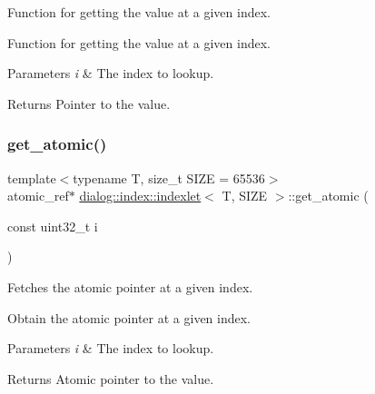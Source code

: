 Function for getting the value at a given index. 

Function for getting the value at a given index.


\begin{DoxyParams}{Parameters}
{\em i} & The index to lookup. \\
\hline
\end{DoxyParams}
\begin{DoxyReturn}{Returns}
Pointer to the value. 
\end{DoxyReturn}
\mbox{\label{classdialog_1_1index_1_1indexlet_ab3d280e9176781621a9b9c627c7db0e6}} 
\subsubsection{\texorpdfstring{get\+\_\+atomic()}{get\_atomic()}}
{\footnotesize\ttfamily template$<$typename T, size\+\_\+t S\+I\+ZE = 65536$>$ \\
atomic\+\_\+ref$\ast$ \hyperlink{classdialog_1_1index_1_1indexlet}{dialog\+::index\+::indexlet}$<$ T, S\+I\+ZE $>$\+::get\+\_\+atomic (\begin{DoxyParamCaption}\item[{const uint32\+\_\+t}]{i }\end{DoxyParamCaption})\hspace{0.3cm}{\ttfamily [inline]}}



Fetches the atomic pointer at a given index. 

Obtain the atomic pointer at a given index.


\begin{DoxyParams}{Parameters}
{\em i} & The index to lookup. \\
\hline
\end{DoxyParams}
\begin{DoxyReturn}{Returns}
Atomic pointer to the value. 
\end{DoxyReturn}
\mbox{\label{classdialog_1_1index_1_1indexlet_aac4ccc3e9c4aa70bfebac6f8b48de7eb}} 
